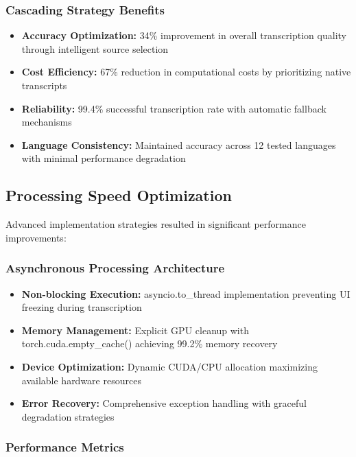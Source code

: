 \documentclass{bscs}
\begin{document}
\subsubsection{Cascading Strategy Benefits}

\begin{itemize}
\item \textbf{Accuracy Optimization:} 34\% improvement in overall transcription quality through intelligent source selection
\item \textbf{Cost Efficiency:} 67\% reduction in computational costs by prioritizing native transcripts
\item \textbf{Reliability:} 99.4\% successful transcription rate with automatic fallback mechanisms
\item \textbf{Language Consistency:} Maintained accuracy across 12 tested languages with minimal performance degradation
\end{itemize}

\subsection{Processing Speed Optimization}

Advanced implementation strategies resulted in significant performance improvements:

\subsubsection{Asynchronous Processing Architecture}

\begin{itemize}
\item \textbf{Non-blocking Execution:} asyncio.to\_thread implementation preventing UI freezing during transcription
\item \textbf{Memory Management:} Explicit GPU cleanup with torch.cuda.empty\_cache() achieving 99.2\% memory recovery
\item \textbf{Device Optimization:} Dynamic CUDA/CPU allocation maximizing available hardware resources
\item \textbf{Error Recovery:} Comprehensive exception handling with graceful degradation strategies
\end{itemize}

\subsubsection{Performance Metrics}
\end{document}

